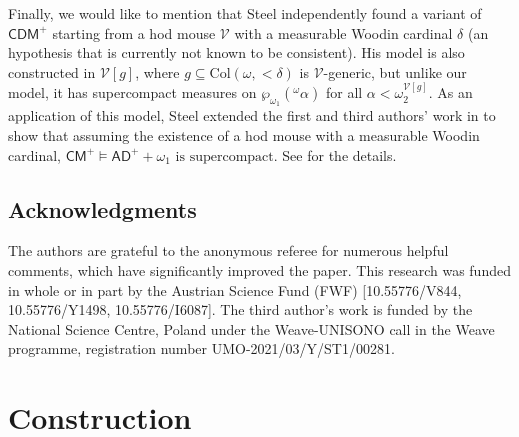 \documentclass{amsart}
\renewcommand{\subset}{\subseteq}
\newcommand{\power}{\wp}
\begin{document}
Finally, we would like to mention that Steel independently found a variant of $\mathsf{CDM}^+$ starting from a hod mouse $\mathcal{V}$ with a measurable Woodin cardinal $\delta$ (an hypothesis that is currently not known to be consistent).
His model is also constructed in $\mathcal{V}[g]$, where $g\subset\mathrm{Col}(\omega, {<}\delta)$ is $\mathcal{V}$-generic, but unlike our model, it has supercompact measures on $\power_{\omega_1}({}^{\omega}\alpha)$ for all $\alpha<\omega_2^{\mathcal{V}[g]}$.
As an application of this model, Steel extended the first and third authors' work in \cite{Det_in_Chang_model} to show that assuming the existence of a hod mouse with a measurable Woodin cardinal, $\mathsf{CM}^+\models\mathsf{AD}^+ + \omega_1\text{ is supercompact}$.
See \cite{gsnote} for the details.

\subsection*{Acknowledgments}

The authors are grateful to the anonymous referee for numerous helpful comments, which have significantly improved the paper.
This research was funded in whole or in part by the Austrian Science Fund (FWF) [10.55776/V844, 10.55776/Y1498, 10.55776/I6087].
The third author's work is funded by the National Science Centre, Poland under the Weave-UNISONO call in the Weave programme, registration number UMO-2021/03/Y/ST1/00281.

\section{Construction}
\end{document}
